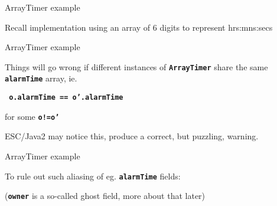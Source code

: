 \documentclass[
pdf,
nocolorBG,
slideColor,
erik,
]{prosper}
\newcommand{\code}[1]{{\rm \texttt{\textbf{\small #1}}}}
\begin{document}
\begin{slide}{ArrayTimer example}
\vspace*{-4ex}

Recall implementation using an array of 6 digits to represent
hrs:mns:secs


\end{slide}




\begin{slide}{ArrayTimer example}
\vspace*{-4ex}


Things will go wrong if different instances of \code{ArrayTimer}
share the same \code{alarmTime} array, ie.
\begin{alltt}\code{\scriptsize
  o.alarmTime == o'.alarmTime}
\end{alltt}
for some \code{o!=o'}

\medskip

ESC/Java2 may notice this, produce a correct, but puzzling, warning.


\end{slide}
\begin{slide}{ArrayTimer example}
\vspace*{-4ex}

To rule out such aliasing of eg. \code{alarmTime} fields:


{\scriptsize\rm (\texttt{\textbf{owner}} is a so-called ghost field, more 
about that later)}

\end{slide}
\end{document}
